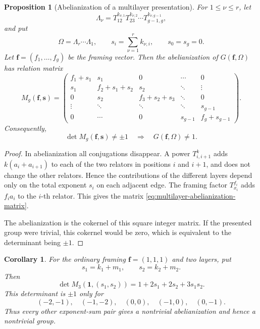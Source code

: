\documentclass{article}
\newtheorem{cy}[theorem]{Corollary}
\newtheorem{prop}[theorem]{Proposition}
\begin{document}
\begin{prop}[Abelianization of a  multilayer presentation]
\label{prop:multilayer-abelianization}
For $1\leq \nu\leq r$, let
\[
 \Lambda_\nu=
 T_{12}^{k_{\nu,1}}T_{23}^{k_{\nu,2}}\cdots
 T_{g-1,g}^{k_{\nu,g-1}},
\]
and put
\[
 \Omega=\Lambda_r\cdots\Lambda_1,
 \qquad
 s_i=\sum_{\nu=1}^r k_{\nu,i},
 \qquad s_0=s_g=0.
\]
Let $\mathbf f=(f_1,\ldots,f_g)$ be the framing vector.  Then the
abelianization of $G(\mathbf f,\Omega)$ has relation matrix
\begin{equation}
 M_g(\mathbf f,\mathbf s)=
 \begin{pmatrix}
 f_1+s_1&s_1&0&\cdots&0\\
 s_1&f_2+s_1+s_2&s_2&\ddots&\vdots\\
 0&s_2&f_3+s_2+s_3&\ddots&0\\
 \vdots&\ddots&\ddots&\ddots&s_{g-1}\\
 0&\cdots&0&s_{g-1}&f_g+s_{g-1}
 \end{pmatrix}.
 \label{eq:multilayer-abelianization-matrix}
\end{equation}
Consequently,
\[
 \det M_g(\mathbf f,\mathbf s)\neq\pm1
 \quad\Longrightarrow\quad
 G(\mathbf f,\Omega)\neq1.
\]
\end{prop}

\begin{proof}
In abelianization all conjugations disappear.  A power
$T_{i,i+1}^{k}$ adds $k(a_i+a_{i+1})$ to each of the two relators in
positions $i$ and $i+1$, and does not change the other relators.  Hence the
contributions of the different layers depend only on the total exponent
$s_i$ on each adjacent edge.  The framing factor $T_{x_i}^{f_i}$ adds
$f_i a_i$ to the $i$-th relator.  This gives the matrix
\eqref{eq:multilayer-abelianization-matrix}.

The abelianization is the cokernel of this square integer matrix.  If the
presented group were trivial, this cokernel would be zero, which is equivalent
to the determinant being $\pm1$.
\end{proof}

\begin{cy}
\label{cor:genus3-two-layer-abelianization}
For the ordinary framing $\mathbf f=(1,1,1)$ and two layers, put
\[
 s_1=k_1+m_1,
 \qquad
 s_2=k_2+m_2.
\]
Then
\[
 \det M_3(\mathbf 1,(s_1,s_2))
 =1+2s_1+2s_2+3s_1s_2.
\]
This determinant is $\pm1$ only for
\[
 (-2,-1),\quad(-1,-2),\quad(0,0),\quad(-1,0),\quad(0,-1).
\]
Thus every other exponent-sum pair gives a nontrivial abelianization and
hence a nontrivial group.
\end{cy}
\end{document}
